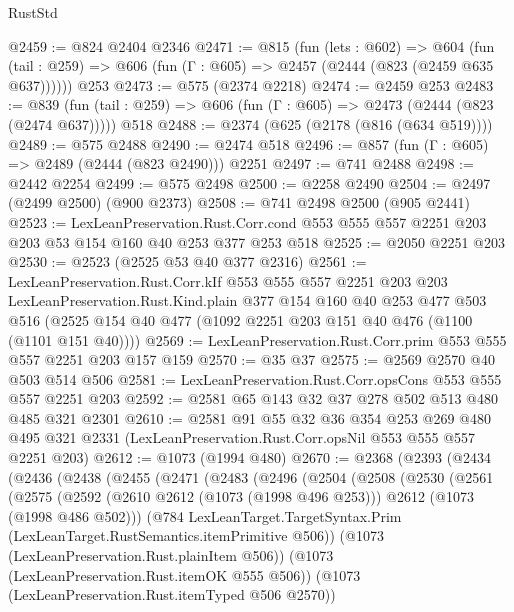 \begin{lexlean}{RustStd}
\begin{coremodule}
@2459 := @824 @2404 @2346
@2471 := @815
    (fun (lets : @602) =>
    @604 (fun (tail : @259) => @606 (fun (Γ : @605) => @2457 (@2444 (@823 (@2459 @635 @637))))))
    @253
@2473 := @575 (@2374 @2218)
@2474 := @2459 @253
@2483 := @839 (fun (tail : @259) => @606 (fun (Γ : @605) => @2473 (@2444 (@823 (@2474 @637))))) @518
@2488 := @2374 (@625 (@2178 (@816 (@634 @519))))
@2489 := @575 @2488
@2490 := @2474 @518
@2496 := @857 (fun (Γ : @605) => @2489 (@2444 (@823 @2490))) @2251
@2497 := @741 @2488
@2498 := @2442 @2254
@2499 := @575 @2498
@2500 := @2258 @2490
@2504 := @2497 (@2499 @2500) (@900 @2373)
@2508 := @741 @2498 @2500 (@905 @2441)
@2523 := LexLeanPreservation.Rust.Corr.cond
    @553
    @555
    @557
    @2251
    @203
    @203
    @53
    @154
    @160
    @40
    @253
    @377
    @253
    @518
@2525 := @2050 @2251 @203
@2530 := @2523 (@2525 @53 @40 @377 @2316)
@2561 := LexLeanPreservation.Rust.Corr.kIf
    @553
    @555
    @557
    @2251
    @203
    @203
    LexLeanPreservation.Rust.Kind.plain
    @377
    @154
    @160
    @40
    @253
    @477
    @503
    @516
    (@2525 @154 @40 @477 (@1092 @2251 @203 @151 @40 @476 (@1100 (@1101 @151 @40))))
@2569 := LexLeanPreservation.Rust.Corr.prim @553 @555 @557 @2251 @203 @157 @159
@2570 := @35 @37
@2575 := @2569 @2570 @40 @503 @514 @506
@2581 := LexLeanPreservation.Rust.Corr.opsCons @553 @555 @557 @2251 @203
@2592 := @2581 @65 @143 @32 @37 @278 @502 @513 @480 @485 @321 @2301
@2610 := @2581
    @91
    @55
    @32
    @36
    @354
    @253
    @269
    @480
    @495
    @321
    @2331
    (LexLeanPreservation.Rust.Corr.opsNil @553 @555 @557 @2251 @203)
@2612 := @1073 (@1994 @480)
@2670 := @2368
    (@2393
      (@2434
        (@2436
          (@2438
            (@2455
              (@2471
                (@2483
                  (@2496
                    (@2504
                      (@2508
                        (@2530
                          (@2561
                            (@2575
                              (@2592
                                (@2610 @2612 (@1073 (@1998 @496 @253)))
                                @2612
                                (@1073 (@1998 @486 @502)))
                              (@784
                                LexLeanTarget.TargetSyntax.Prim
                                (LexLeanTarget.RustSemantics.itemPrimitive @506))
                              (@1073 (LexLeanPreservation.Rust.plainItem @506))
                              (@1073 (LexLeanPreservation.Rust.itemOK @555 @506))
                              (@1073 (LexLeanPreservation.Rust.itemTyped @506 @2570))

\end{coremodule}
\end{lexlean}
